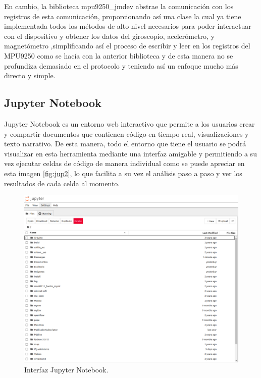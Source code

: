 En cambio, la biblioteca mpu9250\_jmdev abstrae la comunicación con los registros de esta comunicación, proporcionando así una clase la cual ya tiene implementada todos los métodos de alto nivel necesarios para poder interactuar con el dispositivo y obtener los datos del giroscopio, acelerómetro, y magnetómetro ,simplificando así el proceso de escribir y leer en los registros del MPU9250 como se hacía con la anterior biblioteca y de esta manera no se profundiza demasiado en el protocolo y teniendo así un enfoque mucho más directo y simple.

\subsection{Jupyter Notebook}
\label{subsec:Jupyter}

Jupyter Notebook es un entorno web interactivo que permite a los usuarios crear y compartir documentos que contienen código en tiempo real, visualizaciones y texto narrativo. De esta manera, todo el entorno que tiene el usuario se podrá visualizar en esta herramienta mediante una interfaz amigable y permitiendo a su vez ejecutar celdas de código de manera individual como se puede apreciar en esta imagen \ref{fig:jup2}, lo que facilita a su vez el análisis paso a paso y ver los resultados de cada celda al momento.\\

\begin{figure}[H]
  \centering
  \includegraphics[scale=0.4]{figs/jup1} %
  \caption{Interfaz Jupyter Notebook.}
  \label{fig:jup1}
\end{figure}

